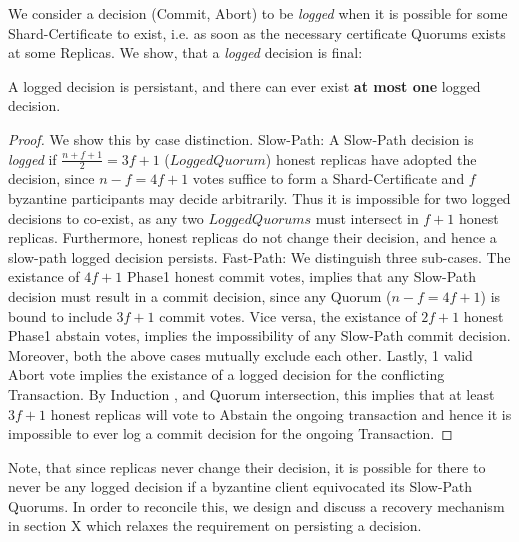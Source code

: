 We consider a decision (Commit, Abort) to be \textit{logged} when it is possible for some Shard-Certificate to exist, i.e. as soon as the necessary certificate Quorums exists at some Replicas. We show, that a \textit{logged} decision is final:
\begin{theorem} 
A logged decision is persistant, and there can ever exist \textbf{at most one} logged decision.
\end{theorem}
\begin{proof}
We show this by case distinction. Slow-Path: A Slow-Path decision is \textit{logged} if $\frac{n+f+1}{2} = 3f+1$ ($LoggedQuorum$) honest replicas have adopted the decision, since $n-f = 4f+1$ votes suffice to form a Shard-Certificate and $f$ byzantine participants may decide arbitrarily. Thus it is impossible for two logged decisions to co-exist, as any two $LoggedQuorums$ must intersect in $f+1$ honest replicas. Furthermore, honest replicas do not change their decision, and hence a slow-path logged decision persists. Fast-Path: We distinguish three sub-cases. The existance of $4f+1$ Phase1 honest commit votes, implies that any Slow-Path decision must result in a commit decision, since any Quorum ($n-f = 4f+1$) is bound to include $3f+1$ commit votes. Vice versa, the existance of $2f+1$ honest Phase1 abstain votes, implies the impossibility of any Slow-Path commit decision. Moreover, both the above cases mutually exclude each other. Lastly, 1 valid Abort vote implies the existance of a logged decision for the conflicting Transaction. By Induction , and Quorum intersection, this implies that at least $3f+1$ honest replicas will vote to Abstain the ongoing transaction and hence it is impossible to ever log a commit decision for the ongoing Transaction.
\end{proof} 

Note, that since replicas never change their decision, it is possible for there to never be any logged decision if a byzantine client equivocated its Slow-Path Quorums. In order to reconcile this, we design and discuss a recovery mechanism in section X which relaxes the requirement on persisting a decision.  


